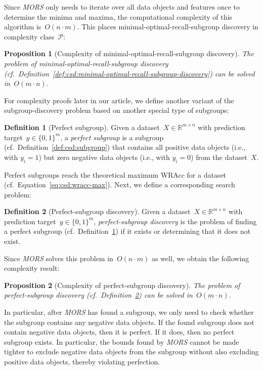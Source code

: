 \documentclass{article}
\newtheorem{proposition}{Proposition}
\theoremstyle{definition}
\newtheorem{definition}{Definition}
\begin{document}
Since \emph{MORS} only needs to iterate over all data objects and features once to determine the minima and maxima, the computational complexity of this algorithm is~$O(n \cdot m)$.
This places minimal-optimal-recall-subgroup discovery in complexity class~$\mathcal{P}$:
%
\begin{proposition}[Complexity of minimal-optimal-recall-subgroup discovery]
	The problem of minimal-optimal-recall-subgroup discovery (cf.~Definition~\ref{def:csd:minimal-optimal-recall-subgroup-discovery}) can be solved in~$O(m \cdot n)$.
	\label{prop:csd:complexity-unconstrained-minimal-optimal-recall-subgroup-discovery}
\end{proposition}

For complexity proofs later in our article, we define another variant of the subgroup-discovery problem based on another special type of subgroups:
%
\begin{definition}[Perfect subgroup]
	Given a dataset~$X \in \mathbb{R}^{m \times n}$ with prediction target~$y \in \{0, 1\}^m$,
	a \emph{perfect subgroup} is a subgroup (cf.~Definition~\ref{def:csd:subgroup}) that contains all positive data objects (i.e., with $y_i = 1$) but zero negative data objects (i.e., with $y_i = 0$) from the dataset~$X$.
	\label{def:csd:perfect-subgroup}
\end{definition}
%
Perfect subgroups reach the theoretical maximum WRAcc for a dataset (cf.~Equation~\ref{eq:csd:wracc-max}).
Next, we define a corresponding search problem:
%
\begin{definition}[Perfect-subgroup discovery]
	Given a dataset~$X \in \mathbb{R}^{m \times n}$ with prediction target~$y \in \{0, 1\}^m$,
	\emph{perfect-subgroup discovery} is the problem of finding a perfect subgroup (cf.~Definition~\ref{def:csd:perfect-subgroup}) if it exists or determining that it does not exist.
	\label{def:csd:perfect-subgroup-discovery}
\end{definition}
%
Since \emph{MORS} solves this problem in~$O(n \cdot m)$ as well, we obtain the following complexity result:
%
\begin{proposition}[Complexity of perfect-subgroup discovery]
	The problem of perfect-subgroup discovery (cf.~Definition~\ref{def:csd:perfect-subgroup-discovery}) can be solved in~$O(m \cdot n)$.
	\label{prop:csd:complexity-unconstrained-perfect-subgroup}
\end{proposition}
%
In particular, after \emph{MORS} has found a subgroup, we only need to check whether the subgroup contains any negative data objects.
If the found subgroup does not contain negative data objects, then it is perfect.
If it does, then no perfect subgroup exists.
In particular, the bounds found by \emph{MORS} cannot be made tighter to exclude negative data objects from the subgroup without also excluding positive data objects, thereby violating perfection.
\end{document}
